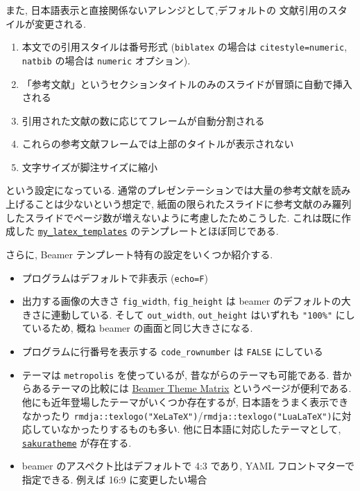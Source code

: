 \documentclass[
  xelatex,ja=standard,jafont=noto]{bxjsbook}
\providecommand{\tightlist}{%
  \setlength{\itemsep}{0pt}\setlength{\parskip}{0pt}}
\theoremstyle{definition}
\theoremstyle{definition}
\theoremstyle{definition}
\theoremstyle{definition}
\theoremstyle{remark}
\begin{document}
また, 日本語表示と直接関係ないアレンジとして,デフォルトの
文献引用のスタイルが変更される.

\begin{enumerate}
\def\labelenumi{\arabic{enumi}.}
\tightlist
\item
  本文での引用スタイルは番号形式 (\texttt{biblatex} の場合は
  \texttt{citestyle=numeric}, \texttt{natbib} の場合は \texttt{numeric}
  オプション).
\item
  「参考文献」というセクションタイトルのみのスライドが冒頭に自動で挿入される
\item
  引用された文献の数に応じてフレームが自動分割される
\item
  これらの参考文献フレームでは上部のタイトルが表示されない
\item
  文字サイズが脚注サイズに縮小
\end{enumerate}

という設定になっている.
通常のプレゼンテーションでは大量の参考文献を読み上げることは少ないという想定で,
紙面の限られたスライドに参考文献のみ羅列したスライドでページ数が増えないように考慮したためこうした.
これは既に作成した
\href{https://github.com/Gedevan-Aleksizde/my_latex_templates}{\texttt{my\_latex\_templates}}
のテンプレートとほぼ同じである.

さらに, Beamer テンプレート特有の設定をいくつか紹介する.

\begin{itemize}
\tightlist
\item
  プログラムはデフォルトで非表示 (\texttt{echo=F})
\item
  出力する画像の大きさ \texttt{fig\_width}, \texttt{fig\_height} は
  beamer のデフォルトの大きさに連動している. そして \texttt{out\_width},
  \texttt{out\_height} はいずれも \texttt{"100\%"} にしているため, 概ね
  beamer の画面と同じ大きさになる.
\item
  プログラムに行番号を表示する \texttt{code\_rownumber} は
  \texttt{FALSE} にしている
\item
  テーマは \texttt{metropolis} を使っているが,
  昔ながらのテーマも可能である. 昔からあるテーマの比較には
  \href{https://hartwork.org/beamer-theme-matrix/}{Beamer Theme Matrix}
  というページが便利である.
  他にも近年登場したテーマがいくつか存在するが,
  日本語をうまく表示できなかったり
  \texttt{rmdja::texlogo("XeLaTeX")}/\texttt{rmdja::texlogo("LuaLaTeX")}に対応していなかったりするものも多い.
  他に日本語に対応したテーマとして,
  \href{https://github.com/pecorarista/sakuratheme}{\texttt{sakuratheme}}
  が存在する.
\item
  beamer のアスペクト比はデフォルトで 4:3 であり, YAML
  フロントマターで指定できる. 例えば 16:9 に変更したい場合
\end{itemize}
\end{document}
